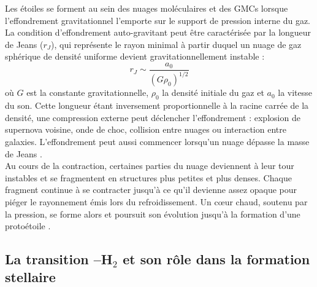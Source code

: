 Les étoiles se forment au sein des nuages moléculaires et des GMCs lorsque l'effondrement gravitationnel l'emporte sur le support de pression interne du gaz. La condition d'effondrement auto-gravitant peut être caractérisée par la longueur de Jeans ($r_J$), qui représente le rayon minimal à partir duquel un nuage de gaz sphérique de densité uniforme devient gravitationnellement instable :
\begin{equation}
    r_J \sim \frac{a_0}{(G\rho_0)^{1/2}}
\end{equation}
\noindent où $G$ est la constante gravitationnelle, $\rho_0$ la densité initiale du gaz et $a_0$ la vitesse du son. Cette longueur étant inversement proportionnelle à la racine carrée de la densité, une compression externe peut déclencher l'effondrement : explosion de supernova voisine, onde de choc, collision entre nuages ou interaction entre galaxies. L'effondrement peut aussi commencer lorsqu'un nuage dépasse la masse de Jeans \citep{Jeans1902, ISF2011}.\\\indent
Au cours de la contraction, certaines parties du nuage deviennent à leur tour instables et se fragmentent en structures plus petites et plus denses. Chaque fragment continue à se contracter jusqu'à ce qu'il devienne assez opaque pour piéger le rayonnement émis lors du refroidissement. Un cœur chaud, soutenu par la pression, se forme alors et poursuit son évolution jusqu'à la formation d'une protoétoile \citep{ISF2011, Klessen2016}.

\subsection{La transition \HI--H$_2$ et son rôle dans la formation stellaire}

